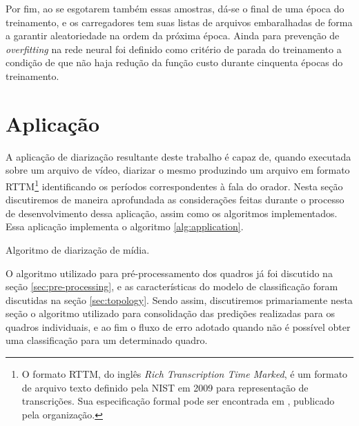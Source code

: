 Por fim, ao se esgotarem também essas amostras, dá-se o final de uma época do treinamento, e os carregadores tem suas listas de arquivos embaralhadas de forma a garantir aleatoriedade na ordem da próxima época.
Ainda para prevenção de \textit{overfitting} na rede neural foi definido como critério de parada do treinamento a condição de que não haja redução da função custo durante cinquenta épocas do treinamento.

\section{Aplicação}
\label{sec:application}

A aplicação de diarização resultante deste trabalho é capaz de, quando executada sobre um arquivo de vídeo, diarizar o mesmo produzindo um arquivo em formato RTTM\footnote{O formato RTTM, do inglês \textit{Rich Transcription Time Marked}, é um formato de arquivo texto definido pela NIST em 2009 para representação de transcrições. Sua especificação formal pode ser encontrada em \cite{nist2009RT09Rich2009}, publicado pela organização.} identificando os períodos correspondentes à fala do orador. 
Nesta seção discutiremos de maneira aprofundada as considerações feitas durante o processo de desenvolvimento dessa aplicação, assim como os algoritmos implementados. Essa aplicação implementa o algoritmo \ref{alg:application}.

\begin{algorithm}[ht]
    \SetAlgoLined
    \caption{Algoritmo de diarização de mídia.}
    \label{alg:application}
\end{algorithm}

O algoritmo utilizado para pré-processamento dos quadros já foi discutido na seção \ref{sec:pre-processing}, e as características do modelo de classificação foram discutidas na seção \ref{sec:topology}.
Sendo assim, discutiremos primariamente nesta seção o algoritmo utilizado para consolidação das predições realizadas para os quadros individuais, e ao fim o fluxo de erro adotado quando não é possível obter uma classificação para um determinado quadro.


